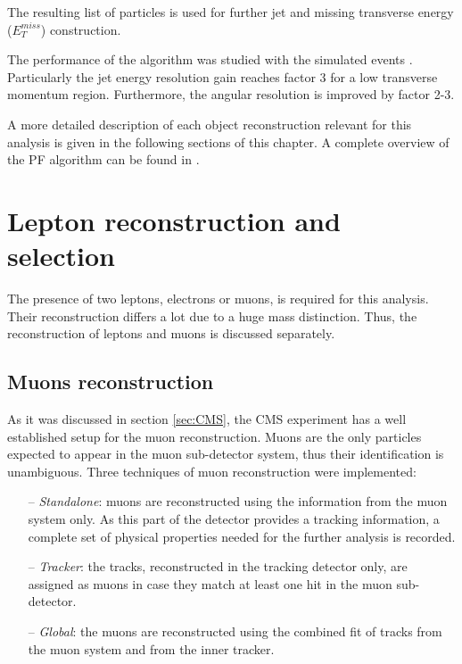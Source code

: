 The resulting list of particles is used for further jet and missing transverse energy ($E_{T}^{miss}$) construction. 

The performance of the algorithm was studied with the simulated events \cite{CMS-PAS-PFT-09-001}. Particularly the jet energy
resolution gain reaches factor 3 for a low transverse momentum region. Furthermore, the angular resolution is improved by factor 2-3.

A more detailed description of each object reconstruction relevant for this analysis is given in the following sections of this chapter.
A complete overview of the PF algorithm can be found in \cite{CMS-PAS-PFT-09-001}. 


\section{Lepton reconstruction and selection}

The presence of two leptons, electrons or muons, is required for this analysis. Their reconstruction
differs a lot due to a huge mass distinction. Thus, the reconstruction of leptons and muons is discussed separately.

\subsection{Muons reconstruction}

As it was discussed in section \ref{sec:CMS}, the CMS experiment has a well established setup for the muon reconstruction.
Muons are the only particles expected to appear in the muon sub-detector system, thus their identification is unambiguous.
Three techniques of muon reconstruction were implemented:

\begin{itemize}
 \item [--] \textit{Standalone}: muons are reconstructed using the information from the muon system only. As 
 this part of the detector provides a tracking information, a complete set of physical properties needed for the further
 analysis is recorded.
 
 \item [--] \textit{Tracker}: the tracks, reconstructed in the tracking detector only, are assigned as muons in case they 
 match at least one hit in the muon sub-detector. 
 
 \item [--] \textit{Global}: the muons are reconstructed using 
 the combined fit of tracks from the muon system and from the inner tracker.
\end{itemize}

